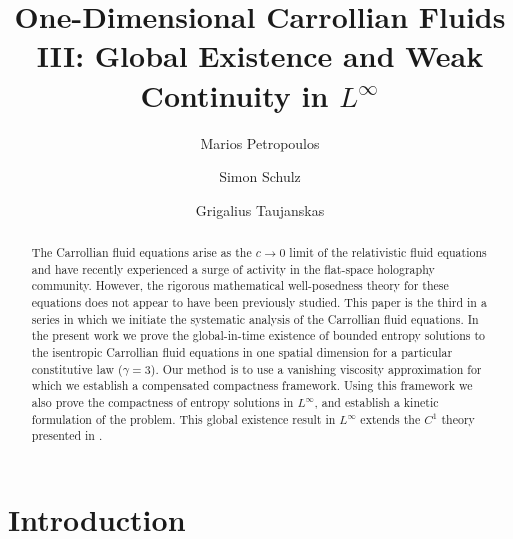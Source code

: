 \documentclass[11pt,a4paper,reqno]{amsart}
\title[Carrollian Fluids in One Dimension]{One-Dimensional Carrollian Fluids III: Global Existence and Weak Continuity in $L^\infty$}
\author[P.~M.~Petropoulos]{Marios Petropoulos}
\author[S.~M.~Schulz]{Simon Schulz}
\author[G.~Taujanskas]{Grigalius Taujanskas}
\numberwithin{equation}{section}
\theoremstyle{definition}
\theoremstyle{remark}
\begin{document}
\begin{abstract}

The Carrollian fluid equations arise as the $c \to 0$ limit of the relativistic fluid equations and have recently experienced a surge of activity in the flat-space holography community. However, the rigorous mathematical well-posedness theory for these equations does not appear to have been previously studied. This paper is the third in a series in which we initiate the systematic analysis of the Carrollian fluid equations. In the present work we prove the global-in-time existence of bounded entropy solutions to the isentropic Carrollian fluid equations in one spatial dimension for a particular constitutive law ($\gamma = 3$). Our method is to use a vanishing viscosity approximation for which we establish a compensated compactness framework. Using this framework we also prove the compactness of entropy solutions in $L^\infty$, and establish a kinetic formulation of the problem. This global existence result in $L^\infty$ extends the $C^1$ theory presented in \cite{AthanasiouPetropoulosSchulzTaujanskas24a}.
    
 
\end{abstract}

\maketitle
\thispagestyle{empty}



\setcounter{tocdepth}{1}
\tableofcontents





\section{Introduction}
\end{document}
